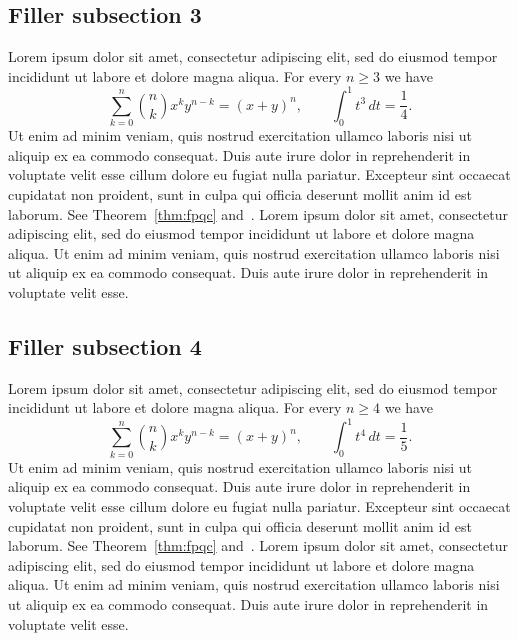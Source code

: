 \documentclass[11pt]{amsart}
\theoremstyle{definition}
\theoremstyle{remark}
\begin{document}
\subsection{Filler subsection 3}
Lorem ipsum dolor sit amet, consectetur adipiscing elit, sed do eiusmod
tempor incididunt ut labore et dolore magna aliqua. For every $n\ge 3$ we have
\[
\sum_{k=0}^{n}\binom{n}{k}x^k y^{n-k}=(x+y)^n,\qquad
\int_0^1 t^{3}\,dt=\frac{1}{4}.
\]
Ut enim ad minim veniam, quis nostrud exercitation ullamco laboris nisi ut
aliquip ex ea commodo consequat. Duis aute irure dolor in reprehenderit in
voluptate velit esse cillum dolore eu fugiat nulla pariatur. Excepteur sint
occaecat cupidatat non proident, sunt in culpa qui officia deserunt mollit
anim id est laborum. See Theorem~\ref{thm:fpqc} and~\cite{Vistoli}.
Lorem ipsum dolor sit amet, consectetur adipiscing elit, sed do eiusmod
tempor incididunt ut labore et dolore magna aliqua. Ut enim ad minim veniam,
quis nostrud exercitation ullamco laboris nisi ut aliquip ex ea commodo
consequat. Duis aute irure dolor in reprehenderit in voluptate velit esse.

\subsection{Filler subsection 4}
Lorem ipsum dolor sit amet, consectetur adipiscing elit, sed do eiusmod
tempor incididunt ut labore et dolore magna aliqua. For every $n\ge 4$ we have
\[
\sum_{k=0}^{n}\binom{n}{k}x^k y^{n-k}=(x+y)^n,\qquad
\int_0^1 t^{4}\,dt=\frac{1}{5}.
\]
Ut enim ad minim veniam, quis nostrud exercitation ullamco laboris nisi ut
aliquip ex ea commodo consequat. Duis aute irure dolor in reprehenderit in
voluptate velit esse cillum dolore eu fugiat nulla pariatur. Excepteur sint
occaecat cupidatat non proident, sunt in culpa qui officia deserunt mollit
anim id est laborum. See Theorem~\ref{thm:fpqc} and~\cite{Vistoli}.
Lorem ipsum dolor sit amet, consectetur adipiscing elit, sed do eiusmod
tempor incididunt ut labore et dolore magna aliqua. Ut enim ad minim veniam,
quis nostrud exercitation ullamco laboris nisi ut aliquip ex ea commodo
consequat. Duis aute irure dolor in reprehenderit in voluptate velit esse.
\end{document}
